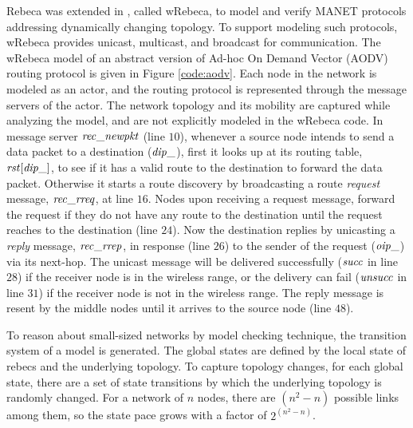 Rebeca was extended in \cite{FOAC}, called wRebeca, to model and verify %
MANET protocols addressing dynamically changing topology. To support modeling such protocols, wRebeca provides unicast, multicast, and broadcast for communication. The wRebeca model of an abstract version of Ad-hoc On Demand Vector (AODV) routing protocol \cite{AODV} is given in Figure \ref{code:aodv}. Each node in the network is modeled as an actor, and the routing protocol
is represented through the message servers of the actor. The network topology and its mobility are captured while analyzing the model, and are not explicitly modeled in the wRebeca code.  
%
In message server ${\it rec\_newpkt}$ (line $10$),
whenever a source node intends to send a data packet to a destination (${\it dip\_}$), %
first it looks up at its routing table, ${\it rst}[{\it dip\_}]$, to see if it has a valid route to the destination to forward the data packet. Otherwise it starts a route discovery by broadcasting a route \emph{request} message, ${\it rec\_rreq}$, at line $16$. 
%
Nodes upon receiving a request message, forward the request if they do not have any route to the destination until the request reaches to the destination (line $24$). Now the destination replies by unicasting a \emph{reply} message, ${\it rec\_rrep}$, in response (line $26$) to the sender of the request (${\it oip\_}$) via its next-hop. The unicast message will be delivered
successfully ($\it succ$ in line $28$) if the receiver node is in the wireless range, or the
delivery can fail ($\it unsucc$ in line $31$) if the receiver node is not in the wireless range. The reply message is resent by the middle nodes until it arrives to the source node (line $48$).

\begin{figure*}
	\begin{center}
		
	\end{center}
	\caption{The AODV protocol specified by wRebeca \label{code:aodv}\cite{FOAC}}
\end{figure*} 

To reason about small-sized networks by model checking technique, the transition system of a model is generated. The global states %
are defined by the local state of rebecs and the underlying topology. %
To capture topology changes, for each global state, there are a set of state transitions by which the underlying topology is randomly changed.  For a network of $n$ nodes, there are $(n^2-n)$ possible links among them, %
so the state pace grows with a factor of $2^{(n^2-n)}$. 

